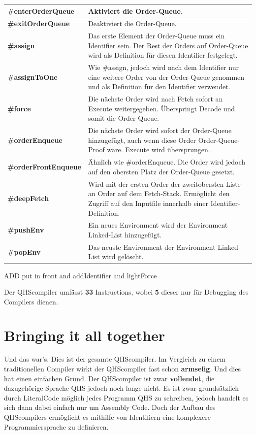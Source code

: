 \begin{table}[H]
    \centering
    \begin{tabularx}{\textwidth}{l|X}
    \textbf{\#enterOrderQueue}      & Aktiviert die Order-Queue. \\ \hline
    \textbf{\#exitOrderQueue}       & Deaktiviert die Order-Queue. \\ \hline
    \textbf{\#assign}               & Das erste Element der Order-Queue muss ein Identifier sein. Der Rest der Orders auf Order-Queue wird als Definition für diesen Identifier festgelegt. \\ \hline
    \textbf{\#assignToOne}          & Wie \#assign, jedoch wird nach dem Identifier nur eine weitere Order von der Order-Queue genommen und als Definition für den Identifier verwendet. \\ \hline
    \textbf{\#force}                & Die nächste Order wird nach Fetch sofort an Execute weitergegeben. Überspringt Decode und somit die Order-Queue. \\ \hline
    \textbf{\#orderEnqueue}         & Die nächste Order wird sofort der Order-Queue hinzugefügt, auch wenn diese Order Order-Queue-Proof wäre. Execute wird übersprungen. \\ \hline
    \textbf{\#orderFrontEnqueue}    & Ähnlich wie \#orderEnqueue. Die Order wird jedoch auf den obersten Platz der Order-Queue gesetzt. \\ \hline
    \textbf{\#deepFetch}            & Wird mit der ersten Order der zweitobersten Liste an Order auf dem Fetch-Stack. Ermöglicht den Zugriff auf den Inputfile innerhalb einer Identifier-Definition. \\ \hline
    \textbf{\#pushEnv}              & Ein neues Environment wird der Environment Linked-List hinzugefügt. \\ \hline
    \textbf{\#popEnv}               & Das neuste Environment der Environment Linked-List wird gelöscht.
        
    \end{tabularx}
\end{table}

ADD put in front and addIdentifier and lightForce

Der QHScompiler umfässt \textbf{33} Instructions, wobei \textbf{5} dieser nur für Debugging des Compilers dienen.

\section{Bringing it all together}
Und das war's. Dies ist der gesamte QHScompiler. Im Vergleich zu einem traditionellen Compiler wirkt der QHScompiler fast schon \textbf{armselig}. Und dies hat einen einfachen Grund. Der QHScompiler ist zwar \textbf{vollendet},
die dazugehörige Sprache QHS jedoch noch lange nicht. Es ist zwar grundsätzlich durch LiteralCode möglich jedes Programm QHS zu schreiben, jedoch handelt es sich dann dabei einfach nur um Assembly Code.
Doch der Aufbau des QHScompilers ermöglicht es mithilfe von Identifiern eine komplexere Programmiersprache zu definieren.

